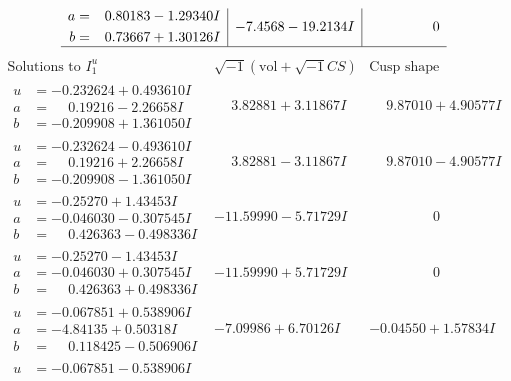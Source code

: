 \documentclass[1p]{elsarticle_modified}
\theoremstyle{definition}
\newcommand{\I}{\sqrt{-1}}
\begin{document}
$$\begin{array}{c|c|c}
\begin{aligned}
a &= \phantom{-}0.80183 - 1.29340 I \\
b &= \phantom{-}0.73667 + 1.30126 I\end{aligned}
 & -7.4568 - 19.2134 I & \phantom{-0.000000 } 0\\
 \hline 
 \end{array}$$\newpage$$\begin{array}{c|c|c}  
\text{Solutions to }I^u_{1}& \I (\text{vol} + \sqrt{-1}CS) & \text{Cusp shape}\\
 \hline 
\begin{aligned}
u &= -0.232624 + 0.493610 I \\
a &= \phantom{-}0.19216 - 2.26658 I \\
b &= -0.209908 + 1.361050 I\end{aligned}
 & \phantom{-}3.82881 + 3.11867 I & \phantom{-}9.87010 + 4.90577 I \\ \hline\begin{aligned}
u &= -0.232624 - 0.493610 I \\
a &= \phantom{-}0.19216 + 2.26658 I \\
b &= -0.209908 - 1.361050 I\end{aligned}
 & \phantom{-}3.82881 - 3.11867 I & \phantom{-}9.87010 - 4.90577 I \\ \hline\begin{aligned}
u &= -0.25270 + 1.43453 I \\
a &= -0.046030 - 0.307545 I \\
b &= \phantom{-}0.426363 - 0.498336 I\end{aligned}
 & -11.59990 - 5.71729 I & \phantom{-0.000000 } 0 \\ \hline\begin{aligned}
u &= -0.25270 - 1.43453 I \\
a &= -0.046030 + 0.307545 I \\
b &= \phantom{-}0.426363 + 0.498336 I\end{aligned}
 & -11.59990 + 5.71729 I & \phantom{-0.000000 } 0 \\ \hline\begin{aligned}
u &= -0.067851 + 0.538906 I \\
a &= -4.84135 + 0.50318 I \\
b &= \phantom{-}0.118425 - 0.506906 I\end{aligned}
 & -7.09986 + 6.70126 I & -0.04550 + 1.57834 I \\ \hline\begin{aligned}
u &= -0.067851 - 0.538906 I \\

\end{aligned}
\end{array}$$
\end{document}
